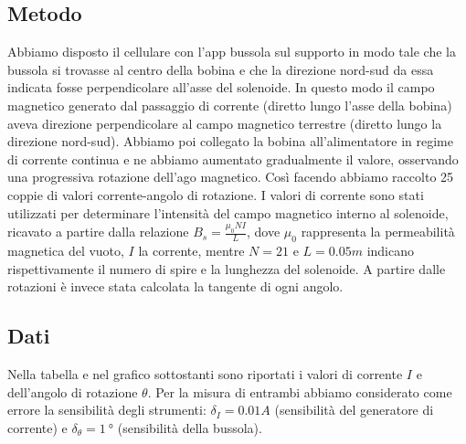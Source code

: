 \documentclass[a4paper]{article}
\begin{document}
\subsection{Metodo}
Abbiamo disposto il cellulare con l’app bussola sul supporto in modo tale che la bussola si trovasse al centro della bobina e che la direzione nord-sud da essa indicata
fosse perpendicolare all'asse del solenoide. In questo modo il campo magnetico generato dal passaggio di corrente (diretto lungo l'asse della bobina) aveva direzione perpendicolare
al campo magnetico terrestre (diretto lungo la direzione nord-sud). Abbiamo poi collegato la bobina all’alimentatore in regime di corrente continua e ne abbiamo aumentato gradualmente il valore,
osservando una progressiva rotazione dell'ago magnetico. Così facendo abbiamo raccolto 25 coppie di valori corrente-angolo di rotazione.
I valori di corrente sono stati utilizzati per determinare l'intensità del campo magnetico interno al solenoide, ricavato a partire dalla relazione \( B_s = \frac {\mu_0NI}{L} \),
dove \(\mu_0\) rappresenta la permeabilità magnetica del vuoto, \( \mathit{I} \) la corrente,
mentre \( \mathit{N=21} \) e \( \mathit{L=0.05m} \) indicano rispettivamente il numero di spire e la lunghezza del solenoide.
A partire dalle rotazioni è invece stata calcolata la tangente di ogni angolo.
\subsection{Dati}
Nella tabella e nel grafico sottostanti sono riportati i valori di corrente \( \mathit{I} \) e dell'angolo di rotazione \(\theta\).
Per la misura di entrambi abbiamo considerato come errore la sensibilità degli strumenti:
\( \mathit{\delta_I=0.01A} \) (sensibilità del generatore di corrente) e \( \mathit{\delta_\theta=\SI{1}{\degree}} \) (sensibilità della bussola).
\end{document}
